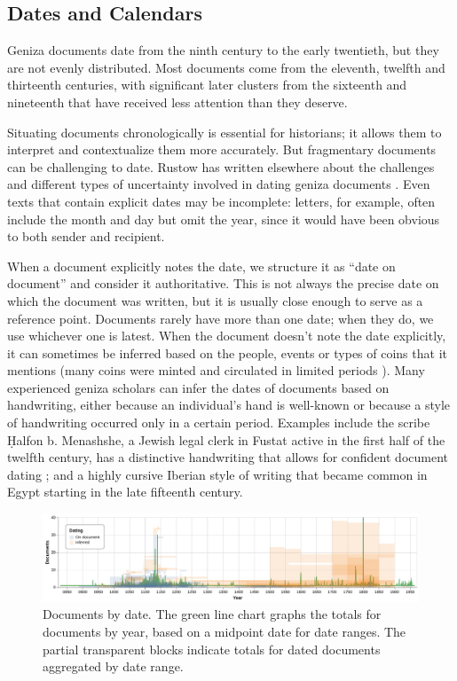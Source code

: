 \documentclass{article}
\begin{document}
\subsection{Dates and Calendars}

Geniza documents date from the ninth century to the early twentieth, but they are not evenly distributed. Most documents come from the eleventh, twelfth and thirteenth centuries, with significant later clusters from the sixteenth and nineteenth that have received less attention than they deserve.

Situating documents chronologically is essential for historians; it allows them to interpret and contextualize them more accurately. But fragmentary documents can be challenging to date. Rustow has written elsewhere about the challenges and different types of uncertainty involved in dating geniza documents \autocite{rustow_dating_nodate}. Even texts that contain explicit dates may be incomplete: letters, for example, often include the month and day but omit the year, since it would have been obvious to both sender and recipient. 

When a document explicitly notes the date, we structure it as “date on document” and consider it authoritative. This is not always the precise date on which the document was written, but it is usually close enough to serve as a reference point. Documents rarely have more than one date; when they do, we use whichever one is latest. When the document doesn't note the date explicitly, it can sometimes be inferred based on the people, events or types of coins that it mentions (many coins were minted and circulated in limited periods \autocite{dudley_coins_2023}). Many experienced geniza scholars can infer the dates of documents based on handwriting, either because an individual’s hand is well-known or because a style of handwriting occurred only in a certain period. Examples include the scribe Ḥalfon b. Menashshe, a Jewish legal clerk in Fustat active in the first half of the twelfth century, has a distinctive handwriting that allows for confident document dating \autocite{elbaum_halfon_nodate}; and a highly cursive Iberian style of writing that became common in Egypt starting in the late fifteenth century.

\begin{figure}[!hbt]
  \centering
  \includegraphics[width=\textwidth]{charts/combined_dating.pdf}
  \caption{Documents by date. The green line chart graphs the totals for documents by year, based on a midpoint date for date ranges. The partial transparent blocks indicate totals for dated documents aggregated by date range.}
  \label{fig:docs_dating_combined}
\end{figure}
\end{document}
